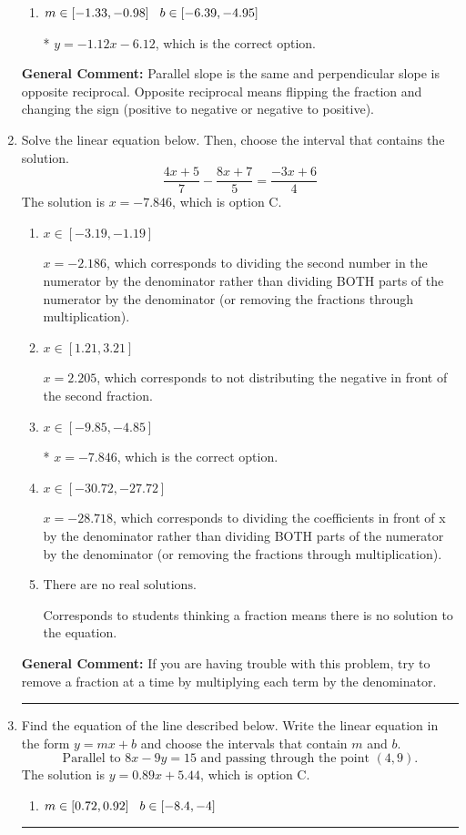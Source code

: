\documentclass{extbook}[14pt]
\newcommand{\litem}[1]{\item #1

\rule{\textwidth}{0.4pt}}
\begin{document}
\begin{enumerate}
{\begin{enumerate}[label=\Alph*.]
 $y = 1.12x + 14.12$, which corresponds to using the negative slope.
\item \( m \in [-1.33, -0.98] \hspace*{3mm} b \in [-6.39, -4.95] \)

* $y = -1.12x - 6.12$, which is the correct option.
\end{enumerate}

\textbf{General Comment:} Parallel slope is the same and perpendicular slope is opposite reciprocal. Opposite reciprocal means flipping the fraction and changing the sign (positive to negative or negative to positive).
}
\litem{
Solve the linear equation below. Then, choose the interval that contains the solution.
\[ \frac{4x + 5}{7} - \frac{8x + 7}{5} = \frac{-3x + 6}{4} \]The solution is \( x = -7.846 \), which is option C.\begin{enumerate}[label=\Alph*.]
\item \( x \in [-3.19, -1.19] \)

 $x = -2.186$, which corresponds to dividing the second number in the numerator by the denominator rather than dividing BOTH parts of the numerator by the denominator (or removing the fractions through multiplication).
\item \( x \in [1.21, 3.21] \)

 $x = 2.205$, which corresponds to not distributing the negative in front of the second fraction.
\item \( x \in [-9.85, -4.85] \)

* $x = -7.846$, which is the correct option.
\item \( x \in [-30.72, -27.72] \)

 $x = -28.718$, which corresponds to dividing the coefficients in front of x by the denominator rather than dividing BOTH parts of the numerator by the denominator (or removing the fractions through multiplication).
\item \( \text{There are no real solutions.} \)

Corresponds to students thinking a fraction means there is no solution to the equation.
\end{enumerate}

\textbf{General Comment:} If you are having trouble with this problem, try to remove a fraction at a time by multiplying each term by the denominator.
}
\litem{
Find the equation of the line described below. Write the linear equation in the form $ y=mx+b $ and choose the intervals that contain $m$ and $b$.
\[ \text{Parallel to } 8 x - 9 y = 15 \text{ and passing through the point } (4, 9). \]The solution is \( y = 0.89x + 5.44 \), which is option C.\begin{enumerate}[label=\Alph*.]
\item \( m \in [0.72, 0.92] \hspace*{3mm} b \in [-8.4, -4] \)


\end{enumerate}}
\end{enumerate}
\end{document}
